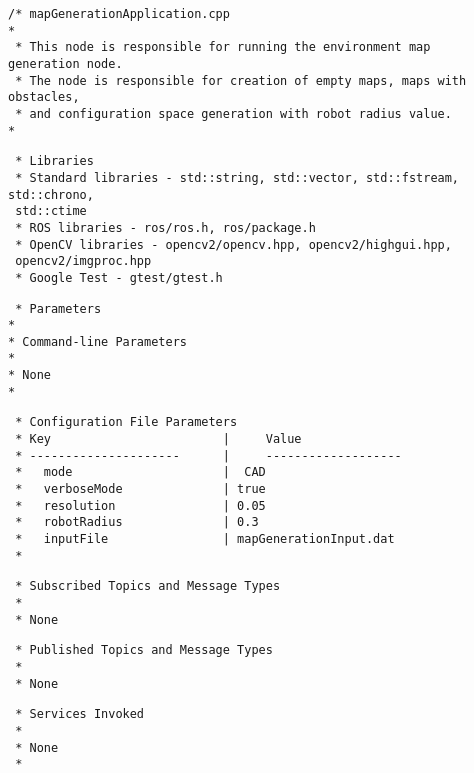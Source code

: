 \documentclass{CSSRforAfrica}
\newcommand{\checkboxChecked}{\fbox{\ding{51}}} %
\begin{document}
\begin{description}

\item[\checkboxChecked] 
 {\small 
\begin{verbatim}
/* mapGenerationApplication.cpp
*
 * This node is responsible for running the environment map generation node.
 * The node is responsible for creation of empty maps, maps with obstacles,
 * and configuration space generation with robot radius value. 
*
\end{verbatim}}

\item[\checkboxChecked] 
 {\small 
\begin{verbatim}
 * Libraries
 * Standard libraries - std::string, std::vector, std::fstream, std::chrono, 
 std::ctime
 * ROS libraries - ros/ros.h, ros/package.h
 * OpenCV libraries - opencv2/opencv.hpp, opencv2/highgui.hpp, 
 opencv2/imgproc.hpp
 * Google Test - gtest/gtest.h
\end{verbatim}}

\item[\checkboxChecked] 
 {\small 
\begin{verbatim}
 * Parameters
*
* Command-line Parameters
*
* None
*
\end{verbatim}}


\item[\checkboxChecked] 
 {\small 
\begin{verbatim}
 * Configuration File Parameters
 * Key                        |     Value
 * ---------------------      |     -------------------
 *   mode                     |  CAD
 *   verboseMode              | true
 *   resolution               | 0.05
 *   robotRadius              | 0.3
 *   inputFile                | mapGenerationInput.dat
 *
\end{verbatim}}

\item[\checkboxChecked] 
 {\small 
\begin{verbatim}
 * Subscribed Topics and Message Types
 *
 * None
\end{verbatim}}

\newpage
\item[\checkboxChecked] 
 {\small 
\begin{verbatim}                    
 * Published Topics and Message Types
 *
 * None
\end{verbatim}}

\item[\checkboxChecked] 
 {\small 
\begin{verbatim}                    
 * Services Invoked
 * 
 * None
 *
\end{verbatim}}


\end{description}
\end{document}
